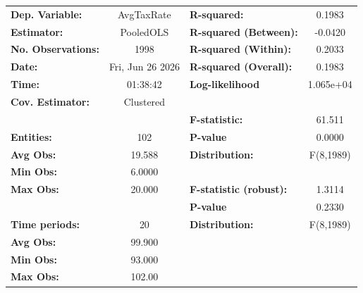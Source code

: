 \begin{center}
\begin{tabular}{lclc}
\toprule
\textbf{Dep. Variable:}                       &     AvgTaxRate     & \textbf{  R-squared:         }   &      0.1983      \\
\textbf{Estimator:}                           &     PooledOLS      & \textbf{  R-squared (Between):}  &     -0.0420      \\
\textbf{No. Observations:}                    &        1998        & \textbf{  R-squared (Within):}   &      0.2033      \\
\textbf{Date:}                                &  Fri, Jun 26 2026  & \textbf{  R-squared (Overall):}  &      0.1983      \\
\textbf{Time:}                                &      01:38:42      & \textbf{  Log-likelihood     }   &    1.065e+04     \\
\textbf{Cov. Estimator:}                      &     Clustered      & \textbf{                     }   &                  \\
\textbf{}                                     &                    & \textbf{  F-statistic:       }   &      61.511      \\
\textbf{Entities:}                            &        102         & \textbf{  P-value            }   &      0.0000      \\
\textbf{Avg Obs:}                             &       19.588       & \textbf{  Distribution:      }   &    F(8,1989)     \\
\textbf{Min Obs:}                             &       6.0000       & \textbf{                     }   &                  \\
\textbf{Max Obs:}                             &       20.000       & \textbf{  F-statistic (robust):} &      1.3114      \\
\textbf{}                                     &                    & \textbf{  P-value            }   &      0.2330      \\
\textbf{Time periods:}                        &         20         & \textbf{  Distribution:      }   &    F(8,1989)     \\
\textbf{Avg Obs:}                             &       99.900       & \textbf{                     }   &                  \\
\textbf{Min Obs:}                             &       93.000       & \textbf{                     }   &                  \\
\textbf{Max Obs:}                             &       102.00       & \textbf{                     }   &                  \\

\end{tabular}
\end{center}
